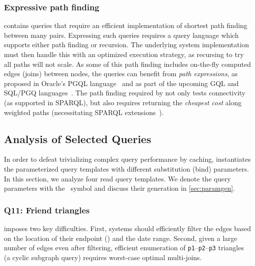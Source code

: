 \subsubsection{Expressive path finding}
\snbbi contains queries that require an efficient implementation of shortest path finding between many pairs.
Expressing such queries requires a query language which supports either path finding or recursion. The underlying system implementation must then handle this with an optimized execution strategy, as recursing to try all paths will not scale.
As some of this path finding includes on-the-fly computed edges (joins) between nodes, the queries can benefit from {\em path expressions}, as proposed in Oracle's PGQL language~\cite{DBLP:conf/grades/RestHKMC16} and as part of the upcoming GQL and SQL/PGQ languages~\cite{DBLP:conf/sigmod/DeutschFGHLLLMM22}.
The path finding required by \snbbi not only tests connectivity (as supported in SPARQL), but also requires returning the {\em cheapest cost} along weighted paths (necessitating SPARQL extensions~\cite{DBLP:conf/bigdataconf/MizellMR14}).

\subsection{Analysis of Selected Queries}
\label{sec:example-queries}

In order to defeat trivializing complex query performance by caching, \snbbi 
instantiates the parameterized query templates with different substitution (\aka bind) parameters.
In this section, we analyze four read query templates.
We denote the query parameters with the \param{}~symbol and discuss their generation in \autoref{sec:paramgen}.

\subsubsection{Q11: Friend triangles}

 imposes two key difficulties.
First, systems should efficiently filter the \tKnows edges based on the location of their endpoint \tPersons (\tCountry {}) and the date range.
Second, given a large number of \tKnows edges even after filtering,
efficient enumeration of \texttt{p1}--\texttt{p2}--\texttt{p3} triangles (a cyclic subgraph query)
requires worst-case optimal multi-joins.

